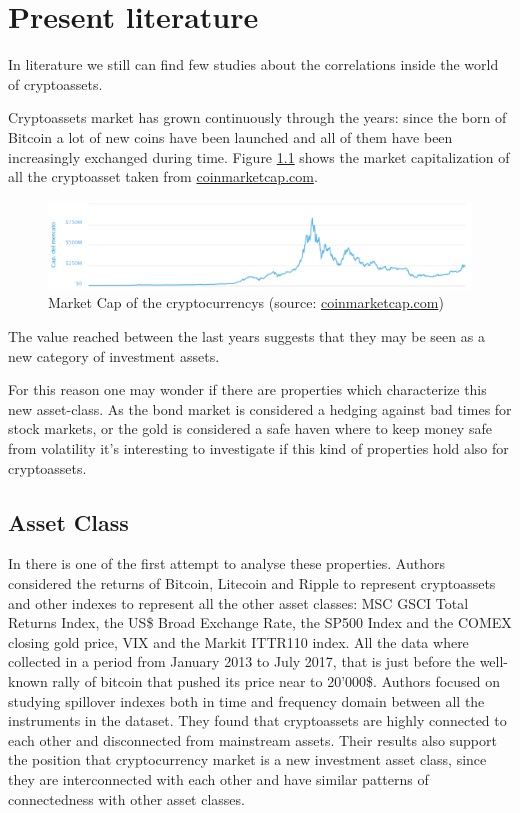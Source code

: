 \chapter{Present literature}
\label{chpr:ch2}
\bigskip
In literature we still can find few studies about the correlations inside the world of cryptoassets.

Cryptoassets market has grown continuously through the years: since the born of Bitcoin a lot of new coins have been launched and all of them have been increasingly exchanged during time.
Figure \ref{mc_allcrypto} shows the market capitalization of all the cryptoasset taken from \href{https://coinmarketcap.com/it/charts/}{coinmarketcap.com}. 

\begin{figure}[htpb]
		\centering
		\includegraphics[width=13cm]{Images/mktcap.png} %
		\caption{Market Cap of the cryptocurrencys (source: \href{https://coinmarketcap.com/it/charts/}{coinmarketcap.com})}
		\label{mc_allcrypto}
\end{figure}
\bigskip
\noindent
The value reached between the last years suggests that they may be seen as a new category of investment assets.

For this reason one may wonder if there are properties which characterize this new asset-class.
As the bond market is considered a hedging against bad times for stock markets, or the gold is considered a safe haven where to keep money safe from volatility it’s interesting to investigate if this kind of properties hold also for cryptoassets.

\newpage
\section{Asset Class}
In \citep{corbet} there is one of the first attempt to analyse these properties. Authors considered the returns of Bitcoin, Litecoin and Ripple to represent cryptoassets and other indexes to represent all the other asset classes: MSC GSCI Total Returns Index, the US\$ Broad Exchange Rate, the SP500 Index and the COMEX closing gold price, VIX and the Markit ITTR110 index. All the data where collected in a period from January 2013 to July 2017, that is just before the well-known rally of bitcoin that pushed its price near to 20’000\$.
Authors focused on studying spillover indexes both in time and frequency domain between all the instruments in the dataset. They found that cryptoassets are highly connected to each other and disconnected from mainstream assets. Their results also support the position that cryptocurrency market is a new investment asset class, since they are interconnected with each other and have similar patterns of connectedness with other asset classes.

